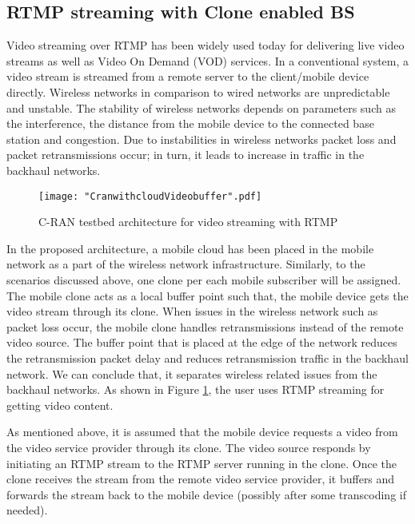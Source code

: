 \documentclass[12pt,journal,compsoc, onecolumn]{IEEEtran}
\begin{document}
\subsection{RTMP streaming with Clone enabled BS}

Video streaming over RTMP has been widely used today for delivering live video streams as well as Video On Demand (VOD) services. In a conventional system, a video stream is streamed from a remote server to the client/mobile device directly. Wireless networks in comparison to wired networks are unpredictable and unstable. The stability of wireless networks depends on parameters such as the interference, the distance from the mobile device to the connected base station and congestion. Due to instabilities in wireless networks packet loss and packet retransmissions occur; in turn, it leads to increase in traffic in the backhaul networks.

\begin{figure}
\centering
  \texttt{[image: "CranwithcloudVideobuffer".pdf]}
  \caption{\label{fig:crancloudvideobuffer} C-RAN testbed architecture for video streaming with RTMP}
\end{figure}

In the proposed architecture, a mobile cloud has been placed in the mobile network as a part of the wireless network infrastructure. Similarly, to the scenarios discussed above, one clone per each mobile subscriber will be assigned. The mobile clone acts as a local buffer point such that, the mobile device gets the video stream through its clone. When issues in the wireless network such as packet loss occur, the mobile clone handles retransmissions instead of the remote video source. The buffer point that is placed at the edge of the network reduces the retransmission packet delay and reduces retransmission traffic in the backhaul network. We can conclude that, it separates wireless related issues from the backhaul networks. As shown in Figure \ref{fig:crancloudvideobuffer}, the user uses RTMP streaming for getting video content. 

As mentioned above, it is assumed that the mobile device requests a video from the video service provider through its clone. The video source responds by initiating an RTMP stream to the RTMP server running in the clone. Once the clone receives the stream from the remote video service provider, it buffers and forwards the stream back to the mobile device (possibly after some transcoding if needed).
\end{document}
